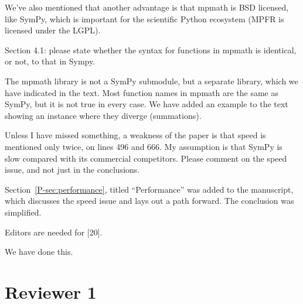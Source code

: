 \documentclass[answers,12pt]{exam}
\begin{document}
\begin{questions}
\begin{solution}
  We've also mentioned that another advantage is that mpmath is BSD licensed,
  like SymPy, which is important for the scientific Python ecosystem (MPFR is
  licensed under the LGPL).
\end{solution}
\question Section 4.1: please state whether the syntax for
functions in mpmath is identical, or not, to that in Sympy.
\begin{solution}
The mpmath library is not a SymPy submodule, but a separate library,
which we have indicated in the text. Most function names in mpmath are the same as SymPy, but it is not true in every case. We have
added an example to the text showing an instance where they diverge
(summations).
\end{solution}
\question Unless I have
missed something, a weakness of the paper is that speed is mentioned only
twice, on lines 496 and 666. My assumption is that SymPy is slow compared with
its commercial competitors. Please comment on the speed issue, and not just in
the conclusions.
\begin{solution}
Section~\ref{P-sec:performance}, titled ``Performance'' was added to the manuscript, which discusses the
speed issue and lays out a path forward. The conclusion was simplified.
\end{solution}
\question Editors are needed for [20].
\begin{solution}
We have done this.
\end{solution}
\end{questions}

\section{Reviewer 1}
\end{document}
